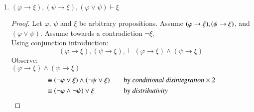 \documentclass{article}
\newcommand{\lif}{\mathrel{\rightarrow}}
\newcommand{\proves}{\mathrel{\vdash}}
\begin{document}
\begin{enumerate}
\begin{enumerate}
\begin{proof}
        Let $\varphi$ and $\psi$ be arbitrary propositions. Assume $\varphi$. Towards a contradiction, suppose $\neg ( \varphi \lor \psi )$. Using conjunction introduction, \\$\varphi$,$\neg (\varphi \lor \psi) \proves\varphi\land \neg (\varphi \lor \psi)$ Observe:
        \begin{align*}
          \varphi\land \neg (\varphi \lor \psi)
            &\equiv \varphi\land(\neg\varphi\land\neg\psi)
              &\quad
              &\text{by \emph{De Morgan's laws}}
              \\
            &\equiv (\varphi\land\neg\varphi)\land\neg\psi
              &\quad
              &\text{by \emph{associativity}}
              \\
            &\equiv \bot\land\neg\psi
              &\quad
              &\text{by \emph{complement}}
              \\
            &\equiv \bot
              &\quad
              &\text{by \emph{domination}}
              \\
        \end{align*} 
        So, we have $\neg (\varphi \lor \psi)\proves\bot$. However, we also have $\neg (\varphi \lor \psi)\proves\top$ because we assumed $\neg (\varphi \lor \psi)$. Therefore, by Reductio ad Absurdum we can conclude $\neg(\neg (\varphi \lor \psi))$ or $\varphi \lor \psi$.\\
        \end{proof}
        \item $(\varphi \lif \xi), (\psi \lif \xi), (\varphi \lor \psi) \proves \xi$
        \begin{proof}
        Let $\varphi$, $\psi$ and $\xi$ be arbitrary propositions. Assume $(\varphi \lif \xi),\\(\psi \lif \xi)$, and $(\varphi \lor \psi)$. Assume towards a contradiction $\neg\xi$.\\Using conjunction introduction: $$(\varphi \lif \xi), (\psi \lif \xi), \proves (\varphi \lif \xi)\land (\psi \lif \xi)$$
        Observe:\\
        $(\varphi \lif \xi)\land (\psi \lif \xi)$
        \begin{align*}
            &\equiv (\neg\varphi \lor \xi)\land (\neg\psi \lor \xi)
              &\quad
              &\text{by \emph{conditional disintegration}}\times2
              \\
            &\equiv (\neg\varphi\land\neg\psi)\lor\xi
              &\quad
              &\text{by \emph{distributivity}}

\end{align*}
\end{proof}
\end{enumerate}
\end{enumerate}
\end{document}
